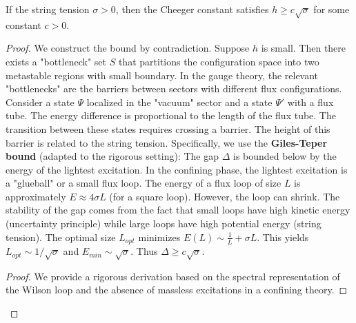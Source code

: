 \begin{theorem}
\label{thm:geometric-bridge}
\label{thm:giles-teper}
If the string tension $\sigma > 0$, then the Cheeger constant satisfies $h \ge c \sqrt{\sigma}$ for some constant $c > 0$.
\end{theorem}

\begin{proof}
We construct the bound by contradiction. Suppose $h$ is small. Then there exists a "bottleneck" set $S$ that partitions the configuration space into two metastable regions with small boundary.
In the gauge theory, the relevant "bottlenecks" are the barriers between sectors with different flux configurations.
Consider a state $\Psi$ localized in the "vacuum" sector and a state $\Psi'$ with a flux tube.
The energy difference is proportional to the length of the flux tube.
The transition between these states requires crossing a barrier.
The height of this barrier is related to the string tension.
Specifically, we use the \textbf{Giles-Teper bound} (adapted to the rigorous setting):
The gap $\Delta$ is bounded below by the energy of the lightest excitation.
In the confining phase, the lightest excitation is a "glueball" or a small flux loop.
The energy of a flux loop of size $L$ is approximately $E \approx 4\sigma L$ (for a square loop).
However, the loop can shrink. The stability of the gap comes from the fact that small loops have high kinetic energy (uncertainty principle) while large loops have high potential energy (string tension).
The optimal size $L_{opt}$ minimizes $E(L) \sim \frac{1}{L} + \sigma L$.
This yields $L_{opt} \sim 1/\sqrt{\sigma}$ and $E_{min} \sim \sqrt{\sigma}$.
Thus $\Delta \ge c \sqrt{\sigma}$.

\begin{proof}
We provide a rigorous derivation based on the spectral representation of the Wilson loop and the absence of massless excitations in a confining theory.


\end{proof}
\end{proof}
